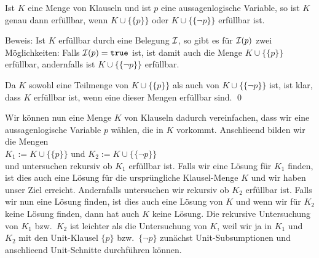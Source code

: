 \begin{Satz}
  Ist $K$ eine Menge von Klauseln und ist $p$ eine aussagenlogische Variable, 
  so ist $K$ genau dann erf\"{u}llbar, wenn $K \cup \bigl\{\{p\}\bigr\}$ oder 
  $K \cup \bigl\{\{\neg p\}\bigr\}$ erf\"{u}llbar ist.  
\end{Satz}
Beweis: 
Ist $K$ erf\"{u}llbar durch eine
Belegung $\mathcal{I}$, so gibt es f\"{u}r  $\mathcal{I}(p)$ zwei M\"{o}glichkeiten:  Falls $\mathcal{I}(p) = \mathtt{true}$ ist, ist
damit auch die Menge $K \cup \bigl\{\{p\}\bigr\}$ erf\"{u}llbar, andernfalls ist
$K \cup \bigl\{\{\neg p\}\bigr\}$ erf\"{u}llbar. 

Da $K$ sowohl eine Teilmenge von $K \cup \bigl\{\{p\}\bigr\}$ als auch von 
$K \cup \bigl\{\{\neg p\}\bigr\}$ ist, ist klar, dass $K$ erf\"{u}llbar
ist, wenn eine dieser Mengen erf\"{u}llbar sind.  
\qed

Wir k\"{o}nnen nun eine Menge $K$ von Klauseln dadurch vereinfachen, dass wir eine
aussagenlogische Variable $p$ w\"{a}hlen, die in $K$ vorkommt.
Anschlie\3end bilden wir die Mengen \\[0.2cm]
\hspace*{1.3cm} $K_1 := K \cup \bigl\{\{p\}\bigr\}$ \quad und \quad $K_2 := K \cup
\bigl\{\{\neg p\}\bigr\}$
\\[0.2cm]
und untersuchen rekursiv ob $K_1$ erf\"{u}llbar ist.  Falls wir eine L\"{o}sung f\"{u}r $K_1$ finden,
ist dies auch eine L\"{o}sung f\"{u}r die urspr\"{u}ngliche Klausel-Menge $K$ und wir haben unser Ziel
erreicht.
Andernfalls untersuchen wir rekursiv ob $K_2$ erf\"{u}llbar ist.
Falls wir nun eine L\"{o}sung finden, ist dies auch eine L\"{o}sung von $K$ und wenn wir f\"{u}r $K_2$
keine L\"{o}sung finden, dann hat auch $K$ keine L\"{o}sung.
Die rekursive Untersuchung von $K_1$ bzw.~$K_2$ ist leichter als die Untersuchung von $K$,
weil wir ja in $K_1$ und $K_2$ mit den Unit-Klausel $\{p\}$ bzw.~$\{\neg p\}$
zun\"{a}chst Unit-Subsumptionen und anschlie\3end Unit-Schnitte durchf\"{u}hren k\"{o}nnen.


